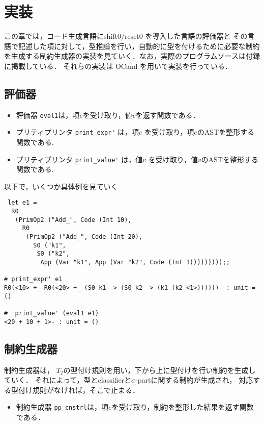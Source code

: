\chapter{実装}
この章では，コード生成言語にshift0/reset0 を導入した言語の評価器と
その言語で記述した項に対して，型推論を行い，自動的に型を付けるために必要な制約を生成する制約生成器の実装を見ていく．なお，実際のプログラムソースは付録に掲載している．
それらの実装は OCaml を用いて実装を行っている．

\section{評価器}
\begin{itemize}
\item 評価器 \lstinline|eval1|は，項$e$を受け取り，値$v$を返す関数である．
\item プリティプリンタ \lstinline|print_expr'| は，項$e$ を受け取り，項$e$のASTを整形する関数である.
\item プリティプリンタ \lstinline|print_value'| は，値$v$ を受け取り，値$v$のASTを整形する関数である.
\end{itemize}

以下で，いくつか具体例を見ていく

\begin{lstlisting}
 let e1 =
  R0
   (PrimOp2 ("Add_", Code (Int 10),
     R0
      (PrimOp2 ("Add_", Code (Int 20),
        S0 ("k1",
         S0 ("k2",
          App (Var "k1", App (Var "k2", Code (Int 1)))))))));;

# print_expr' e1
R0(<10> +_ R0(<20> +_ (S0 k1 -> (S0 k2 -> (k1 (k2 <1>))))))- : unit = ()

#  print_value' (eval1 e1)
<20 + 10 + 1>- : unit = ()

\end{lstlisting}

\section{制約生成器}
制約生成器は， $T_2$の型付け規則を用い，下から上に型付けを行い制約を生成していく．
それによって，型とclassifierと$\sigma$-partに関する制約が生成され，
対応する型付け規則がなければ，そこで止まる．
\begin{itemize}
\item 制約生成器 \lstinline|pp_cnstrl|は，項$e$を受け取り，制約を整形した結果を返す関数である．
\end{itemize}

